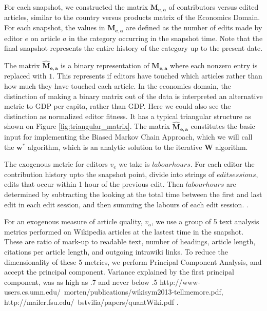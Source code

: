  For each snapshot, we constructed the matrix $\mathbf{M_{e,a}}$ of contributors versus edited articles, similar to the country versus products matrix of the Economics Domain. For each snapshot, the values in $\mathbf{M_{e,a}}$ are defined as the number of edits made by editor $e$ on article $a$ in the category occurring in the snapshot time. Note that the final snapshot represents the entire history of the category up to the present date.
  
The matrix $\mathbf{\hat{M}_{e,a}}$ is a binary representation of $\mathbf{M_{e,a}}$ where each nonzero entry is replaced with $1$. This represents if editors have touched which articles rather than how much they have touched each article. In the economics domain, the distinction of making a binary matrix out of the data is interpreted an alternative metric to GDP per capita, rather than GDP. Here we could also see the distinction as normalized editor fitness. It has a typical triangular structure as shown on Figure \ref{fig:triangular_matrix}. The matrix $\mathbf{\hat{M}_{e,a}}$ constitutes the basic input for implementing the Biased Markov Chain Approach, which we will call the $\mathbf{w^*}$ algorithm, which is an analytic solution to the iterative $\mathbf{W}$ algorithm. \cite{Caldarelli} 

The exogenous metric for editors $v_e$ we take is $labour hours$. For each editor the contribution history upto the snapshot point,  divide into strings of $edit sessions$, edits that occur within 1 hour of the previous edit. Then $labour hours$ are determined by subtracting the looking at the total time between the first and last edit in each edit session, and then summing the labours of each edit session. \cite{Geiger, Halfaker}. 

For an exogenous measure of article quality, $ v_a$,  we use a group of 5 text analysis metrics performed on Wikipedia articles at the lastest time in the snapshot. These are ratio of mark-up to readable text, number of headings, article length, citations per article length, and outgoing intrawiki links. To reduce the dimensionality of these 5 metrics, we perform Principal Component Analysis, and accept the principal component. Variance explained by the first principal component, was as high as .7 and never below .5 http://www-users.cs.umn.edu/~morten/publications/wikisym2013-tellmemore.pdf, http://mailer.fsu.edu/~bstvilia/papers/quantWiki.pdf \cite{ Morten}.